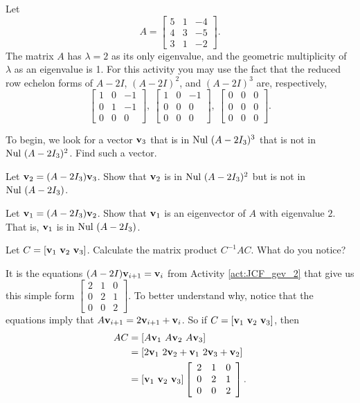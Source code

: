 \begin{activity} \label{act:JCF_gev_2} Let 
\[A = \left[ \begin{array}{ccr} 5&1&-4\\4&3&-5\\3&1&-2 \end{array} \right].\]
The matrix $A$ has $\lambda = 2$ as its only eigenvalue, and the geometric multiplicity of $\lambda$ as an eigenvalue is 1. For this activity you may use the fact that the reduced row echelon forms of $A-2I$, $(A-2I)^2$, and $(A-2I)^3$ are, respectively, 
\[\left[ \begin{array}{ccr} 1&0&-1\\0&1&-1\\0&0&0 \end{array} \right], \ \left[ \begin{array}{ccr} 1&0&-1\\0&0&0\\0&0&0 \end{array} \right], \ \left[ \begin{array}{ccc} 0&0&0\\0&0&0\\0&0&0 \end{array} \right].\]
\ba
\item To begin, we look for a vector $\mathbf{v}_3$ that is in $\text{Nul } (A-2I_3)^3$ that is not in $\text{Nul } (A-2I_3)^2$. Find such a vector.

\item Let $\mathbf{v}_2 = (A-2I_3)\mathbf{v}_3$. Show that $\mathbf{v}_2$ is in $\text{Nul } (A-2I_3)^2$ but is not in $\text{Nul } (A-2I_3)$. 

\item Let $\mathbf{v}_1 = (A-2I_3)\mathbf{v}_2$. Show that $\mathbf{v}_1$ is an eigenvector of $A$ with eigenvalue $2$. That is, $\mathbf{v}_1$ is in $\text{Nul } (A-2I_3)$. 

\item Let $C = [\mathbf{v}_1 \ \mathbf{v}_2 \ \mathbf{v}_3]$. Calculate the matrix product $C^{-1}AC$. What do you notice? 

\ea

\end{activity}

It is the equations $(A- 2I)\mathbf{v}_{i+1} = \mathbf{v}_i$ from Activity \ref{act:JCF_gev_2} that give us this simple form $\left[ \begin{array}{ccc} 2&1&0 \\ 0&2&1 \\ 0&0&2 \end{array} \right]$. To better understand why, notice that the equations  imply that $A\mathbf{v}_{i+1} = 2\mathbf{v}_{i+1} + \mathbf{v}_i$.  So if $C = [\mathbf{v}_1 \ \mathbf{v}_2 \ \mathbf{v}_3]$, then 
\begin{align*}
AC &= [A\mathbf{v}_1 \ A\mathbf{v}_2 \ A\mathbf{v}_3] \\
	&= [2 \mathbf{v}_1 \ 2 \mathbf{v}_2 + \mathbf{v}_1 \ 2 \mathbf{v}_3 + \mathbf{v}_2] \\
	&= [\mathbf{v}_1 \ \mathbf{v}_2 \ \mathbf{v}_3] \left[ \begin{array}{ccc} 2&1&0 \\ 0&2&1 \\ 0&0&2 \end{array} \right].
\end{align*} 

